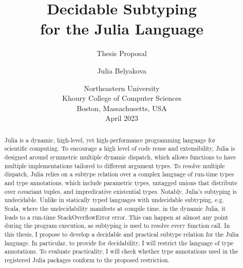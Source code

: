 \title{Decidable Subtyping\\for the Julia Language}
\subtitle{Thesis Proposal}

\author{Julia Belyakova}

\date{\normalsize%
Northeastern University\\
Khoury College of Computer Sciences\\
Boston, Massachusetts, USA\\
April 2023
}

\maketitle


\begin{abstract}

Julia is a dynamic, high-level, yet high-performance programming language
for scientific computing.
To encourage a high level of code reuse and extensibility, Julia is
designed around symmetric multiple dynamic dispatch, which allows functions
to have multiple implementations tailored to different argument types.
To resolve multiple dispatch, Julia relies on a subtype relation over a complex
language of run-time types and type annotations, which include parametric types,
untagged unions that distribute over covariant tuples, and impredicative
existential types.
Notably, Julia's subtyping is undecidable.
Unlike in statically typed languages
with undecidable subtyping, e.g. Scala, where the undecidability manifests at
compile time, in the dynamic Julia, it leads to a run-time
StackOverflowError error. This can happen
at almost any point during the program execution, as subtyping is used to
resolve every function call.
In this thesis, I propose to develop a decidable and practical subtype relation
for the Julia language.
In particular, to provide for decidability, I will restrict the language of type
annotations. To evaluate practicality, I will check whether type annotations
used in the registered Julia packages conform to the proposed restriction.

\end{abstract}


\tableofcontents
